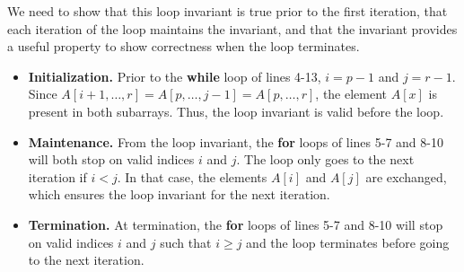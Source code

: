 \begin{enumerate}
\begin{framed}
\begin{enumerate}
{We need to show that this loop invariant is true prior to the first iteration,
that each iteration of the loop maintains the invariant, and that the invariant
provides a useful property to show correctness when the loop terminates.
\begin{itemize}
  \item \textbf{Initialization.} Prior to the \textbf{while} loop of lines 4-13,
    $i = p - 1$ and $j = r - 1$. Since
    $A[i + 1, \dots, r] = A[p, \dots, j - 1] = A[p, \dots, r]$, the
    element $A[x]$ is present in both subarrays. Thus, the loop invariant is
    valid before the loop.
  \item \textbf{Maintenance.} From the loop invariant, the \textbf{for} loops of
    lines 5-7 and 8-10 will both stop on valid indices $i$ and $j$. The loop
    only goes to the next iteration if $i < j$. In that case, the elements
    $A[i]$ and $A[j]$ are exchanged, which ensures the loop invariant for the
    next iteration.
  \item \textbf{Termination.} At termination, the \textbf{for} loops of lines
    5-7 and 8-10 will stop on valid indices $i$ and $j$ such that $i \ge j$ and
    the loop terminates before going to the next iteration.
\end{itemize}

}
\end{enumerate}
\end{framed}
\end{enumerate}
